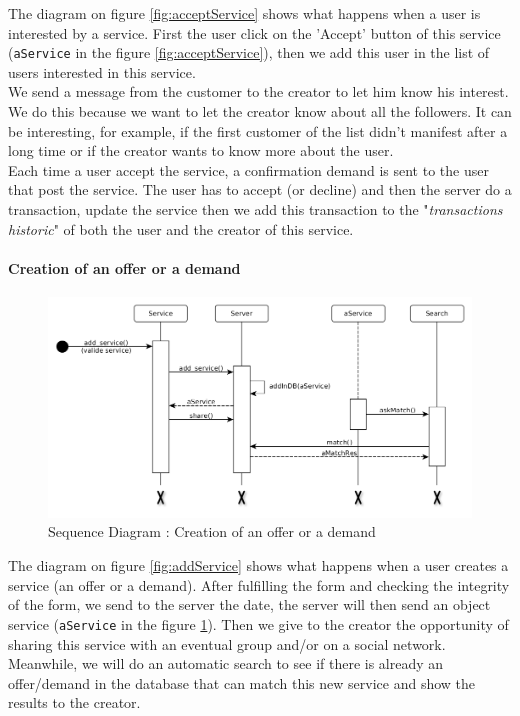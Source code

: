The diagram on figure \vref{fig:acceptService} shows what happens when a user is interested by a service. First the user click on the 'Accept' button of this service (\texttt{aService} in the figure \ref{fig:acceptService}), then we add this user in the list of users interested in this service.
\\ 
We send a message from the customer to the creator to let him know his 
interest. We do this because we want to let the creator know about all the 
followers. It can be interesting, for example, if the first customer of the 
list didn't manifest after a long time or if the creator wants to know more
about the user.
\\
Each time a user accept the service, a confirmation demand is sent to the user that 
post the service. The user has to accept (or decline) and then the server do a 
transaction, update the service then we add this transaction to the 
"\textit{transactions historic}" of both the user and the creator of this service.


\paragraph{Creation of an offer or a demand}

\begin{figure}[H]
	\begin{center}
		\includegraphics[width=.9\textwidth]{seq_addService.png}
		\caption{Sequence Diagram : Creation of an offer or a demand}
		\label{fig:addService}
	\end{center}
\end{figure}

The diagram on figure \vref{fig:addService} shows what happens when a user creates a service (an offer or a demand). After fulfilling the form and checking the integrity of the form, we send to the server the date, the server will then send an object service (\texttt{aService} in the figure \ref{fig:addService}). Then we give to the creator the opportunity of sharing this service with an eventual group and/or on a social network.\\
Meanwhile, we will do an automatic search to see if there is already an offer/demand in the database that can match this new service and show the results to the creator.

